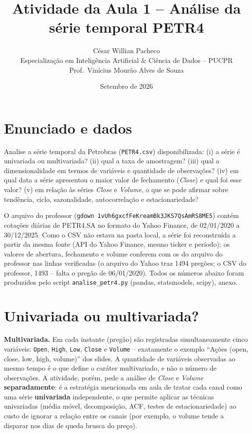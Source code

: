 \documentclass[11pt,a4paper]{article}
\title{\bfseries Atividade da Aula 1 -- Análise da série temporal PETR4}
\author{César Willian Pacheco\\ \small Especialização em Inteligência Artificial \& Ciência de Dados -- PUCPR\\ \small Prof.\ Vinícius Mourão Alves de Souza}
\date{Setembro de 2026}
\begin{document}
\maketitle
\thispagestyle{fancy}

\section*{Enunciado e dados}
Analise a série temporal da Petrobras (\texttt{PETR4.csv}) disponibilizada: (i) a série é univariada ou multivariada? (ii) qual a taxa de amostragem? (iii) qual a dimensionalidade em termos de variáveis e quantidade de observações? (iv) em qual data a série apresentou o maior valor de fechamento (\textit{Close}) e qual foi esse valor? (v) em relação às séries \textit{Close} e \textit{Volume}, o que se pode afirmar sobre tendência, ciclo, sazonalidade, autocorrelação e estacionariedade?

O arquivo do professor (\texttt{gdown 1vUh6gxcfFeKreamBk3JKS7QsAmRS8ME5}) contém cotações diárias de PETR4.SA no formato do Yahoo Finance, de 02/01/2020 a 30/12/2025. Como o CSV não estava na pasta local, a série foi reconstruída a partir da mesma fonte (API do Yahoo Finance, mesmo ticker e período); os valores de abertura, fechamento e volume conferem com os do arquivo do professor nas linhas verificadas (o arquivo do Yahoo traz 1494 pregões; o CSV do professor, 1493 -- falta o pregão de 06/01/2020). Todos os números abaixo foram produzidos pelo script \texttt{analise\_petr4.py} (pandas, statsmodels, scipy), anexo.

\section{Univariada ou multivariada?}
\begin{resposta}
\textbf{Multivariada.} Em cada instante (pregão) são registradas simultaneamente cinco variáveis: \texttt{Open}, \texttt{High}, \texttt{Low}, \texttt{Close} e \texttt{Volume} -- exatamente o exemplo ``Ações (open, close, low, high, volume)'' dos slides. A quantidade de variáveis observadas ao mesmo tempo é o que define o caráter multivariado, e não o número de observações. A atividade, porém, pede a análise de \textit{Close} e \textit{Volume} \textbf{separadamente}: é a estratégia mencionada em aula de tratar cada canal como uma série \textbf{univariada} independente, o que permite aplicar as técnicas univariadas (média móvel, decomposição, ACF, testes de estacionariedade) ao custo de ignorar a relação entre os canais (por exemplo, o volume tende a disparar nos dias de queda brusca do preço).
\end{resposta}
\end{document}
